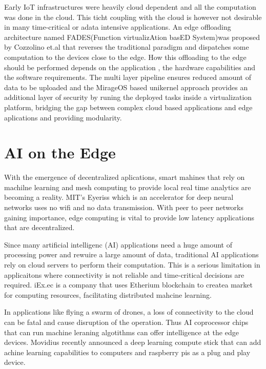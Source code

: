 \documentclass[sigconf]{acmart}
\begin{document}
Early IoT infrastructures were heavily cloud dependent and all the computation was done in the cloud. This ticht coupling with the cloud is however not  desirable in many time-critical or adata intensive applications.\cite{FADES-offloading} An edge offloading architecture named FADES(Function virtualizAtion basED System)was proposed by Cozzolino et.al that reverses the traditional paradigm and dispatches some computation to the devices close to the edge. How this offloading to the edge should be performed depends on the application , the hardware capabilities and the software requirements. \cite{FADES-offloading} The multi layer pipeline ensures reduced amount of data to be uploaded and the MirageOS based unikernel approach provides an additional layer of security by runing the deployed tasks inside a virtualization platform, bridging the gap between complex cloud based applications and edge aplications and providing modularity.\cite{FADES-offloading}


\section{AI on the Edge}
With the emergence of decentralized aplications, smart mahines that rely on machilne learning and mesh computing to provide local real time analytics are becoming a reality. MIT's Eyeriss which is an accelerator for deep neural networks uses no wifi and no data transmission. With peer to peer networks gaining importance, edge computing is vital to provide low latency applications that are decentralized. \cite{ibm_iot_edge}

Since many artificial intelligenc (AI) applications need a huge amount of processing power and rewuire a large amount of data, traditional AI applications rely on cloud servers to perform their computation. This is a serious limitation in applicaitons where connectivity is not reliable and time-critical decisions are required. \cite{ai-to-edge}iEx.ec is a company that uses Etherium blockchain to createa market for computing resources, facilitating distributed mahcine learning. \cite{iExec}

In applications like flying a swarm of drones, a loss of connectivity to the cloud can be fatal and cause disruption of the operation. Thus AI coprocessor chips that can run machine leraning algotithms can offer intelligence at the edge devices. Movidius recently announced a deep learning compute stick that can add achine learning capabilities to computers and raspberry pis as a plug and play device.\cite{ai-to-edge}
\end{document}
